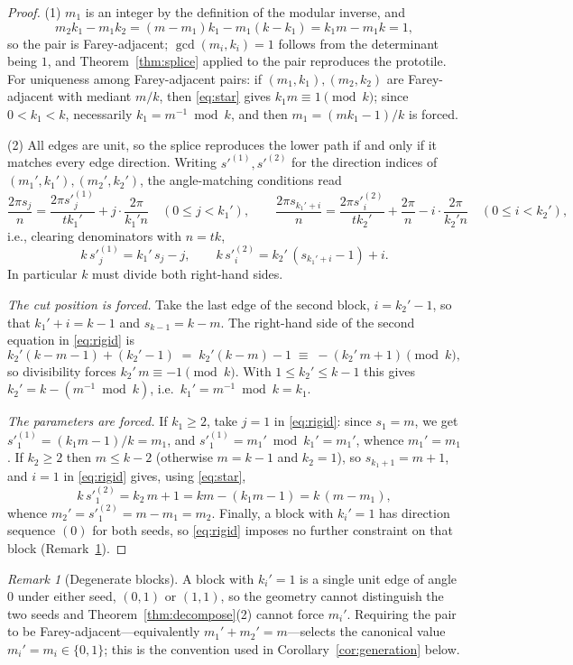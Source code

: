 \documentclass[11pt]{article}
\theoremstyle{remark}
\newtheorem{remark}[theorem]{Remark}
\theoremstyle{definition}
\begin{document}
\begin{proof}
(1) $m_1$ is an integer by the definition of the modular inverse, and
\[
m_2k_1-m_1k_2=(m-m_1)k_1-m_1(k-k_1)=k_1m-m_1k=1,
\]
so the pair is Farey-adjacent; $\gcd(m_i,k_i)=1$ follows from the determinant being $1$,
and Theorem~\ref{thm:splice} applied to the pair reproduces the prototile. For
uniqueness among Farey-adjacent pairs: if $(m_1,k_1),(m_2,k_2)$ are Farey-adjacent with
mediant $m/k$, then \eqref{eq:star} gives $k_1m\equiv 1 \pmod k$; since $0<k_1<k$,
necessarily $k_1=m^{-1}\bmod k$, and then $m_1=(mk_1-1)/k$ is forced.

(2) All edges are unit, so the splice reproduces the lower path if and only if it matches
every edge direction. Writing $s'^{(1)},s'^{(2)}$ for the direction indices of
$(m_1',k_1'),(m_2',k_2')$, the angle-matching conditions read
\[
\frac{2\pi s_j}{n}=\frac{2\pi s'^{(1)}_j}{t k_1'}+j\cdot\frac{2\pi}{k_1' n}
\quad(0\le j< k_1'),
\qquad
\frac{2\pi s_{k_1'+i}}{n}=\frac{2\pi s'^{(2)}_i}{t k_2'}+\frac{2\pi}{n}
-i\cdot\frac{2\pi}{k_2' n}
\quad(0\le i< k_2'),
\]
i.e., clearing denominators with $n=tk$,
\begin{equation}
k\,s'^{(1)}_j = k_1'\,s_j - j,
\qquad
k\,s'^{(2)}_i = k_2'\,(s_{k_1'+i}-1) + i.
\tag{$\dagger$}\label{eq:rigid}
\end{equation}
In particular $k$ must divide both right-hand sides.

\emph{The cut position is forced.} Take the last edge of the second block,
$i=k_2'-1$, so that $k_1'+i=k-1$ and $s_{k-1}=k-m$. The right-hand side of the second
equation in \eqref{eq:rigid} is
\[
k_2'(k-m-1)+(k_2'-1) \;=\; k_2'(k-m)-1 \;\equiv\; -(k_2'\,m+1) \pmod k,
\]
so divisibility forces $k_2'\,m\equiv-1\pmod k$. With $1\le k_2'\le k-1$ this gives
$k_2'=k-(m^{-1}\bmod k)$, i.e.\ $k_1'=m^{-1}\bmod k=k_1$.

\emph{The parameters are forced.} If $k_1\ge2$, take $j=1$ in \eqref{eq:rigid}: since
$s_1=m$, we get $s'^{(1)}_1=(k_1m-1)/k=m_1$, and $s'^{(1)}_1=m_1'\bmod k_1'=m_1'$,
whence $m_1'=m_1$. If $k_2\ge2$ then $m\le k-2$ (otherwise $m=k-1$ and $k_2=1$), so
$s_{k_1+1}=m+1$, and $i=1$ in \eqref{eq:rigid} gives, using \eqref{eq:star},
\[
k\,s'^{(2)}_1 = k_2\,m+1 = km-(k_1m-1) = k\,(m-m_1),
\]
whence $m_2'=s'^{(2)}_1=m-m_1=m_2$. Finally, a block with $k_i'=1$ has direction
sequence $(0)$ for both seeds, so \eqref{eq:rigid} imposes no further constraint on that
block (Remark~\ref{rem:seeds}).
\end{proof}

\begin{remark}[Degenerate blocks]\label{rem:seeds}
A block with $k_i'=1$ is a single unit edge of angle $0$ under either seed, $(0,1)$ or
$(1,1)$, so the geometry cannot distinguish the two seeds and
Theorem~\ref{thm:decompose}(2) cannot force $m_i'$. Requiring the pair to be
Farey-adjacent---equivalently $m_1'+m_2'=m$---selects the canonical value
$m_i'=m_i\in\{0,1\}$; this is the convention used in Corollary~\ref{cor:generation}
below.
\end{remark}
\end{document}

